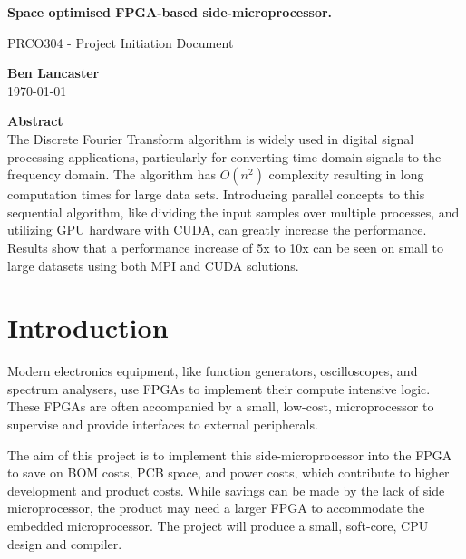 \documentclass[11pt,a4paper]{article}
\begin{document}
\begin{titlepage}
\begin{center}

\vspace*{3cm}
\Large
\textbf{
Space optimised FPGA-based side-microprocessor.
}

\vspace{0.4cm}
\large
PRCO304 - Project Initiation Document

\vspace{4cm}
\textbf{Ben Lancaster}\\
\today

\vspace{4cm}
\textbf{Abstract}\\
\small
The Discrete Fourier Transform algorithm is widely used in digital signal processing applications, particularly for converting time domain signals to the frequency domain. The algorithm has $O(n^2)$ complexity resulting in long computation times for large data sets. Introducing parallel concepts to this sequential algorithm, like dividing the input samples over multiple processes, and utilizing GPU hardware with CUDA, can greatly increase the performance. Results show that a performance increase of 5x to 10x can be seen on small to large datasets using both MPI and CUDA solutions. 


\end{center}

\end{titlepage}

\renewcommand*\contentsname{Table of Contents}
\tableofcontents
\newpage

\section{Introduction}
Modern electronics equipment, like function generators, oscilloscopes, and spectrum analysers, use FPGAs to implement their compute intensive logic. These FPGAs are often accompanied by a small, low-cost, microprocessor to supervise and provide interfaces to external peripherals.

The aim of this project is to implement this side-microprocessor into the FPGA to save on BOM costs, PCB space, and power costs, which contribute to higher development and product costs. While savings can be made by the lack of side microprocessor, the product may need a larger FPGA to accommodate the embedded microprocessor. The project will produce a small, soft-core, CPU design and compiler.
\end{document}
